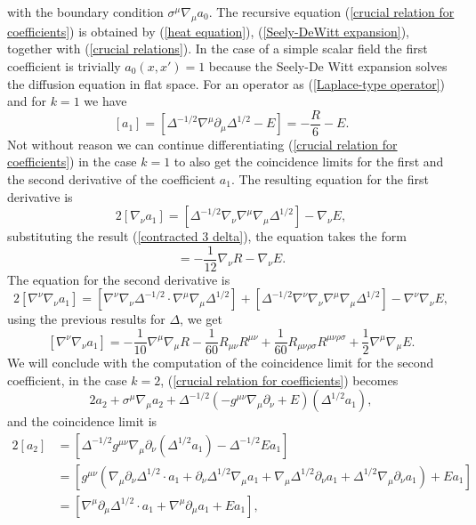 with the boundary condition $\sigma^\mu \nabla_\mu a_0$. The recursive equation (\ref{crucial relation for coefficients}) is obtained by (\ref{heat equation}), (\ref{Seely-DeWitt expansion}), together with (\ref{crucial relations}). In the case of a simple scalar field the first coefficient is trivially $a_0(x,x')=1$ because the Seely-De Witt expansion solves the diffusion equation in flat space. For an operator as (\ref{Laplace-type operator}) and for $k=1$ we have
\begin{equation}\label{c.l.coefficient 1}
    [a_1] = [\Delta^{-1/2}\nabla^\mu \partial_\mu \Delta^{1/2} - E] = -\frac{R}{6} -E.
\end{equation}
Not without reason we can continue differentiating (\ref{crucial relation for coefficients}) in the case $k=1$ to also get the coincidence limits for the first and the second derivative of the coefficient $a_1$. The resulting equation for the first derivative is
\begin{equation}
    2[\nabla_\nu a_1] = [\Delta^{-1/2} \nabla_\nu\nabla^\mu\nabla_\mu \Delta^{1/2}]-\nabla_\nu E,
\end{equation}
substituting the result (\ref{contracted 3 delta}), the equation takes the form
\begin{equation}
    [\nabla_\nu a_1] =-\frac{1}{12}\nabla_\nu R - \nabla_\nu E.
\end{equation}
The equation for the second derivative is 
\begin{equation}
    2[\nabla^\nu\nabla_\nu a_1] = [\nabla^\nu\nabla_\nu \Delta^{-1/2}\cdot\nabla^\mu\nabla_\mu \Delta^{1/2}] + [\Delta^{-1/2}\nabla^\nu\nabla_\nu\nabla^\mu\nabla_\mu \Delta^{1/2}] - \nabla^\nu\nabla_\nu E,
\end{equation}
using the previous results for $\Delta$, we get
\begin{equation}\label{seconde derivative c.l. a_1}
    [\nabla^\nu\nabla_\nu a_1] = -\frac{1}{10}\nabla^\mu \nabla_\mu R -\frac{1}{60} R_{\mu\nu}R^{\mu\nu}  + \frac{1}{60} R_{\mu\nu\rho\sigma}R^{\mu\nu\rho\sigma} +\frac{1}{2}\nabla^\mu \nabla_\mu E.
\end{equation}
We will conclude with the computation of the coincidence limit for the second coefficient, in the case $k=2$, (\ref{crucial relation for coefficients}) becomes
\begin{equation}
    2a_2 + \sigma^\mu \nabla_\mu a_2 + \Delta^{-1/2}(-g^{\mu\nu}\nabla_\mu\partial_\nu + E)(\Delta^{1/2}a_1),
\end{equation}
and the coincidence limit is
\begin{equation}
    \begin{split}
        2[a_2] &=[\Delta^{-1/2}g^{\mu\nu} \nabla_\mu \partial_\nu (\Delta^{1/2}a_1) - \Delta^{-1/2}Ea_1]\\
        &= [g^{\mu\nu}(\nabla_\mu \partial_\nu\Delta^{1/2} \cdot a_1 + \partial_\nu \Delta^{1/2}\nabla_\mu a_1 + \nabla_\mu \Delta^{1/2} \partial_\nu a_1 + \Delta^{1/2}\nabla_\mu \partial_\nu a_1) + Ea_1]\\
        &=[\nabla^\mu \partial_\mu \Delta^{1/2} \cdot a_1+\nabla^\mu \partial_\mu a_1 + Ea_1],
    \end{split}
\end{equation}
